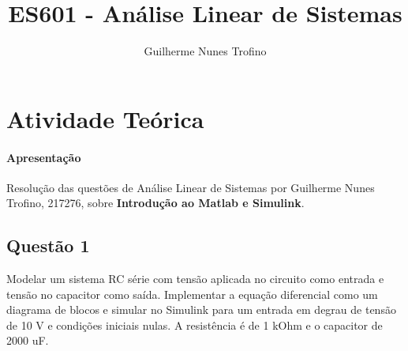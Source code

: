 \documentclass{article}
\title{ES601 - Análise Linear de Sistemas}
\author{Guilherme Nunes Trofino}
\begin{document}
    \maketitle
\newpage

    \section{Atividade Teórica}
        \paragraph{Apresentação}Resolução das questões de Análise Linear de Sistemas por Guilherme Nunes Trofino, 217276, sobre \textbf{Introdução ao Matlab e Simulink}.

        \subsection{Questão 1}
            \begin{exercise}
                Modelar um sistema RC série com tensão aplicada no circuito como entrada e tensão no capacitor como saída. Implementar a equação diferencial como um diagrama de blocos e simular no Simulink para um entrada em degrau de tensão de 10 V e condições iniciais nulas. A resistência é de 1 kOhm e o capacitor de 2000 uF.
            \end{exercise}
\end{document}
